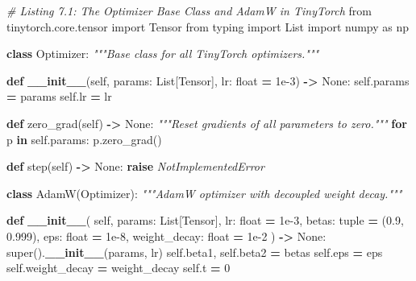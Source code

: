 \documentclass[
  letterpaper,
]{scrbook}
\newenvironment{Shaded}{\begin{snugshade}}{\end{snugshade}}
\newcommand{\BuiltInTok}[1]{#1}
\newcommand{\CommentTok}[1]{\textcolor[rgb]{0.56,0.35,0.01}{\textit{#1}}}
\newcommand{\ControlFlowTok}[1]{\textcolor[rgb]{0.13,0.29,0.53}{\textbf{#1}}}
\newcommand{\DecValTok}[1]{\textcolor[rgb]{0.00,0.00,0.81}{#1}}
\newcommand{\FloatTok}[1]{\textcolor[rgb]{0.00,0.00,0.81}{#1}}
\newcommand{\FunctionTok}[1]{\textcolor[rgb]{0.13,0.29,0.53}{\textbf{#1}}}
\newcommand{\ImportTok}[1]{#1}
\newcommand{\KeywordTok}[1]{\textcolor[rgb]{0.13,0.29,0.53}{\textbf{#1}}}
\newcommand{\NormalTok}[1]{#1}
\newcommand{\OperatorTok}[1]{\textcolor[rgb]{0.81,0.36,0.00}{\textbf{#1}}}
\newcommand{\PreprocessorTok}[1]{\textcolor[rgb]{0.56,0.35,0.01}{\textit{#1}}}
\newcommand{\VariableTok}[1]{\textcolor[rgb]{0.00,0.00,0.00}{#1}}
\begin{document}
\begin{Shaded}
\begin{Highlighting}[]
\CommentTok{\# Listing 7.1: The Optimizer Base Class and AdamW in TinyTorch}
\ImportTok{from}\NormalTok{ tinytorch.core.tensor }\ImportTok{import}\NormalTok{ Tensor}
\ImportTok{from}\NormalTok{ typing }\ImportTok{import}\NormalTok{ List}
\ImportTok{import}\NormalTok{ numpy }\ImportTok{as}\NormalTok{ np}

\KeywordTok{class}\NormalTok{ Optimizer:}
    \CommentTok{"""Base class for all TinyTorch optimizers."""}

    \KeywordTok{def} \FunctionTok{\_\_init\_\_}\NormalTok{(}\VariableTok{self}\NormalTok{, params: List[Tensor], lr: }\BuiltInTok{float} \OperatorTok{=} \FloatTok{1e{-}3}\NormalTok{) }\OperatorTok{{-}\textgreater{}} \VariableTok{None}\NormalTok{:}
        \VariableTok{self}\NormalTok{.params }\OperatorTok{=}\NormalTok{ params}
        \VariableTok{self}\NormalTok{.lr }\OperatorTok{=}\NormalTok{ lr}

    \KeywordTok{def}\NormalTok{ zero\_grad(}\VariableTok{self}\NormalTok{) }\OperatorTok{{-}\textgreater{}} \VariableTok{None}\NormalTok{:}
        \CommentTok{"""Reset gradients of all parameters to zero."""}
        \ControlFlowTok{for}\NormalTok{ p }\KeywordTok{in} \VariableTok{self}\NormalTok{.params:}
\NormalTok{            p.zero\_grad()}

    \KeywordTok{def}\NormalTok{ step(}\VariableTok{self}\NormalTok{) }\OperatorTok{{-}\textgreater{}} \VariableTok{None}\NormalTok{:}
        \ControlFlowTok{raise} \PreprocessorTok{NotImplementedError}

\KeywordTok{class}\NormalTok{ AdamW(Optimizer):}
    \CommentTok{"""AdamW optimizer with decoupled weight decay."""}

    \KeywordTok{def} \FunctionTok{\_\_init\_\_}\NormalTok{(}
        \VariableTok{self}\NormalTok{,}
\NormalTok{        params: List[Tensor],}
\NormalTok{        lr: }\BuiltInTok{float} \OperatorTok{=} \FloatTok{1e{-}3}\NormalTok{,}
\NormalTok{        betas: }\BuiltInTok{tuple} \OperatorTok{=}\NormalTok{ (}\FloatTok{0.9}\NormalTok{, }\FloatTok{0.999}\NormalTok{),}
\NormalTok{        eps: }\BuiltInTok{float} \OperatorTok{=} \FloatTok{1e{-}8}\NormalTok{,}
\NormalTok{        weight\_decay: }\BuiltInTok{float} \OperatorTok{=} \FloatTok{1e{-}2}
\NormalTok{    ) }\OperatorTok{{-}\textgreater{}} \VariableTok{None}\NormalTok{:}
        \BuiltInTok{super}\NormalTok{().}\FunctionTok{\_\_init\_\_}\NormalTok{(params, lr)}
        \VariableTok{self}\NormalTok{.beta1, }\VariableTok{self}\NormalTok{.beta2 }\OperatorTok{=}\NormalTok{ betas}
        \VariableTok{self}\NormalTok{.eps }\OperatorTok{=}\NormalTok{ eps}
        \VariableTok{self}\NormalTok{.weight\_decay }\OperatorTok{=}\NormalTok{ weight\_decay}
        \VariableTok{self}\NormalTok{.t }\OperatorTok{=} \DecValTok{0}


\end{Highlighting}
\end{Shaded}
\end{document}
